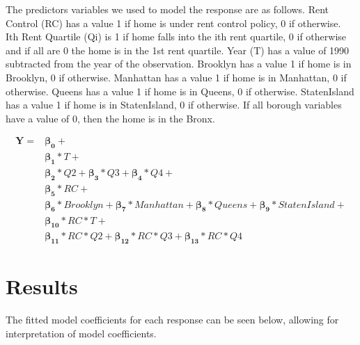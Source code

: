 \documentclass[11pt]{asaproc}\usepackage[]{graphicx}\usepackage[]{color}
\begin{document}
The predictors variables we used to model the response are as follows. Rent Control (RC) has a value 1 if home is under rent control policy, 0 if otherwise. Ith Rent Quartile (Qi) is 1 if home falls into the ith rent quartile, 0 if otherwise and if all are 0 the home is in the 1st rent quartile. Year (T) has a value of 1990 subtracted from the year of the observation. Brooklyn has a value 1 if home is in Brooklyn, 0 if otherwise. Manhattan has a value 1 if home is in Manhattan, 0 if otherwise. Queens has a value 1 if home is in Queens, 0 if otherwise. StatenIsland has a value 1 if home is in StatenIsland, 0 if otherwise. If all borough variables have a value of 0, then the home is in the Bronx.

\begin{align*}
\mathbf{Y} = &\boldsymbol{\beta_0}+\\
&\boldsymbol{\beta_1}*T+\\
&\boldsymbol{\beta_2}*Q2+
\boldsymbol{\beta_3}*Q3+
\boldsymbol{\beta_4}*Q4+\\
&\boldsymbol{\beta_5}*RC+\\
&\boldsymbol{\beta_6}*Brooklyn+
\boldsymbol{\beta_7}*Manhattan+
\boldsymbol{\beta_8}*Queens+
\boldsymbol{\beta_9}*StatenIsland+\\
&\boldsymbol{\beta_{10}}*RC*T+\\
&\boldsymbol{\beta_{11}}*RC*Q2+
\boldsymbol{\beta_{12}}*RC*Q3+
\boldsymbol{\beta_{13}}*RC*Q4
\end{align*}

\section{Results\label{results}}
The fitted model coefficients for each response can be seen below, allowing for interpretation of model coefficients.
\end{document}
